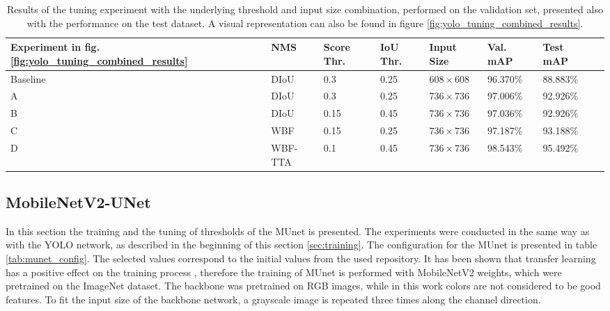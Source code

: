 \begin{table}[H]
\footnotesize
\begin{center}
\begin{tabular}{|l|l|l|l|l|l|l|l|}

\hline
\textbf{Experiment in fig. \ref{fig:yolo_tuning_combined_results}} & \textbf{NMS} & \textbf{Score Thr.} & \textbf{IoU Thr.} & \textbf{Input Size} & \textbf{Val. mAP} & \textbf{Test mAP}\\
\hline
Baseline & DIoU    & 0.3  & 0.25 & $608 \times 608$ & 96.370\% & 88.883\% \\
\hline
A        & DIoU    & 0.3  & 0.25 & $736 \times 736$ & 97.006\% & 92.926\% \\
\hline
B        & DIoU    & 0.15 & 0.45 & $736 \times 736$ & 97.036\% & 92.926\% \\
\hline
C        & WBF     & 0.15 & 0.25 & $736 \times 736$ & 97.187\% & 93.188\% \\
\hline
D        & WBF-TTA & 0.1  & 0.45 & $736 \times 736$ & \cellcolor{green}98.543\% & \cellcolor{green}95.492\% \\
\hline
\end{tabular}
\caption{Results of the tuning experiment with the underlying threshold and input size combination, performed on the validation set, presented also with the performance on the test dataset. A visual representation can also be found in figure \ref{fig:yolo_tuning_combined_results}.}
\label{tab:yolo_tuning_combined_results}
\end{center}
\end{table}




\subsection{MobileNetV2-UNet}

In this section the training and the tuning of thresholds of the \ac{MUnet} is presented.
The experiments were conducted in the same way as with the YOLO network, as described in the beginning of this section \ref{sec:training}.
The configuration for the \ac{MUnet} is presented in table \ref{tab:munet_config}.
The selected values correspond to the initial values from the used repository.
It has been shown that transfer learning has a positive effect on the training process \cite{mobile_unet}, therefore the training of \ac{MUnet} is performed with MobileNetV2 weights, which were pretrained on the ImageNet dataset.
The backbone was pretrained on RGB images, while in this work colors are not considered to be good features.
To fit the input size of the backbone network, a grayscale image is repeated three times along the channel direction.

